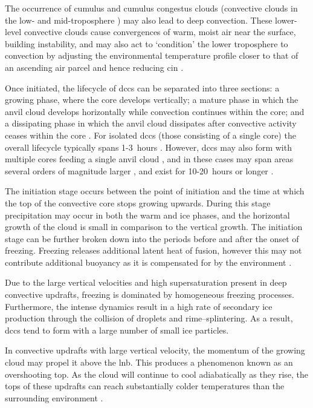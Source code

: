 The occurrence of cumulus and cumulus congestus clouds (convective clouds in the low- and mid-troposphere \citep{johnson_trimodal_1999}) may also lead to deep convection. 
These lower-level convective clouds cause convergences of warm, moist air near the surface, building instability, and may also act to `condition’ the lower troposphere to convection by adjusting the environmental temperature profile closer to that of an ascending air parcel and hence reducing \acrshort{cin} \citep{masunaga_mechanism_2014, schulz_observing_2018}.

Once initiated, the lifecycle of \acrshort{dcc}s can be separated into three sections: a growing phase, where the core develops vertically; a mature phase in which the anvil cloud develops horizontally while convection continues within the core; and a dissipating phase in which the anvil cloud dissipates after convective activity ceases within the core \citep{wall_life_2018}.
For isolated \acrshort{dcc}s (those consisting of a single core) the overall lifecycle typically spans 1-3~hours \citep{chen_diurnal_1997}.
However, \acrshort{dcc}s may also form with multiple cores feeding a single anvil cloud \citep{roca_simple_2017}, and in these cases may span areas several orders of magnitude larger \citep{houze_mesoscale_2004}, and exist for 10-20~hours or longer \citep{chen_diurnal_1997}.

The initiation stage occurs between the point of initiation and the time at which the top of the convective core stops growing upwards.
During this stage precipitation may occur in both the warm and ice phases, and the horizontal growth of the cloud is small in comparison to the vertical growth.
The initiation stage can be further broken down into the periods before and after the onset of freezing.
Freezing releases additional latent heat of fusion, however this may not contribute additional buoyancy as it is compensated for by the environment \citep{seeley_tropical_2016}.

Due to the large vertical velocities and high supersaturation present in deep convective updrafts, freezing is dominated by homogeneous freezing processes.
Furthermore, the intense dynamics result in a high rate of secondary ice production through the collision of droplets and rime--splintering.
As a result, \acrshort{dcc}s tend to form with a large number of small ice particles.

In convective updrafts with large vertical velocity, the momentum of the growing cloud may propel it above the \acrshort{lnb}.
This produces a phenomenon known as an overshooting top.
As the cloud will continue to cool adiabatically as they rise, the tops of these updrafts can reach substantially colder temperatures than the surrounding environment \citep{proud_recordlow_2021}.

